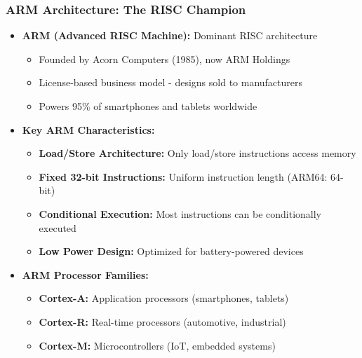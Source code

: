 \begin{frame}
\frametitle{ARM Architecture: The RISC Champion}
\begin{itemize}
    \item \textbf{ARM (Advanced RISC Machine):} Dominant RISC architecture
    \begin{itemize}
        \item Founded by Acorn Computers (1985), now ARM Holdings
        \item License-based business model - designs sold to manufacturers
        \item Powers 95\% of smartphones and tablets worldwide
    \end{itemize}
    \item \textbf{Key ARM Characteristics:}
    \begin{itemize}
        \item \textbf{Load/Store Architecture:} Only load/store instructions access memory
        \item \textbf{Fixed 32-bit Instructions:} Uniform instruction length (ARM64: 64-bit)
        \item \textbf{Conditional Execution:} Most instructions can be conditionally executed
        \item \textbf{Low Power Design:} Optimized for battery-powered devices
    \end{itemize}
    \item \textbf{ARM Processor Families:}
    \begin{itemize}
        \item \textbf{Cortex-A:} Application processors (smartphones, tablets)
        \item \textbf{Cortex-R:} Real-time processors (automotive, industrial)
        \item \textbf{Cortex-M:} Microcontrollers (IoT, embedded systems)
    \end{itemize}
\end{itemize}
\end{frame}

